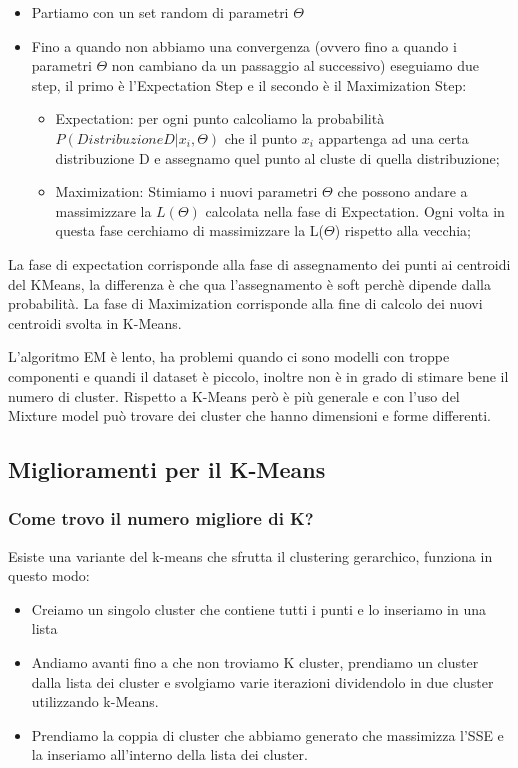 \documentclass[14pt]{extreport}
\begin{document}
\begin{itemize}
    \item Partiamo con un set random di parametri $\Theta$
    \item Fino a quando non abbiamo una convergenza (ovvero fino a quando i parametri $\Theta$ non cambiano da un passaggio al successivo) eseguiamo due step, il primo è l'Expectation Step e il secondo è il Maximization Step:
        \begin{itemize}
            \item Expectation: per ogni punto calcoliamo la probabilità \newline $P(Distribuzione D|x_i,\Theta)$ che il punto $x_i$ appartenga ad una certa distribuzione D e assegnamo quel punto al cluste di quella distribuzione;
            \item Maximization: Stimiamo i nuovi parametri $\Theta$ che possono andare a massimizzare la $L(\Theta)$ calcolata nella fase di Expectation. Ogni volta in questa fase cerchiamo di massimizzare la L($\Theta$) rispetto alla vecchia;
        \end{itemize}
\end{itemize}

La fase di expectation corrisponde alla fase di assegnamento dei punti ai centroidi del KMeans, la differenza è che qua l'assegnamento è soft perchè dipende dalla probabilità.
La fase di Maximization corrisponde alla fine di calcolo dei nuovi centroidi svolta in K-Means.

L'algoritmo EM è lento, ha problemi quando ci sono modelli con troppe componenti e quandi il dataset è piccolo, inoltre non è in grado di stimare bene il numero di cluster.
Rispetto a K-Means però è più generale e con l'uso del Mixture model può trovare dei cluster che hanno dimensioni e forme differenti.

\subsection{Miglioramenti per il K-Means}

\subsubsection{Come trovo il numero migliore di K?}

Esiste una variante del k-means che sfrutta il clustering gerarchico, funziona in questo modo:
\begin{itemize}
    \item Creiamo un singolo cluster che contiene tutti i punti e lo inseriamo in una lista
    \item Andiamo avanti fino a che non troviamo K cluster, prendiamo un cluster dalla lista dei cluster e svolgiamo varie iterazioni dividendolo in due cluster utilizzando k-Means. 
    \item Prendiamo la coppia di cluster che abbiamo generato che massimizza l'SSE e la inseriamo all'interno della lista dei cluster.
\end{itemize}
\end{document}
